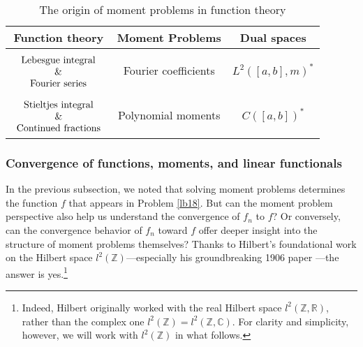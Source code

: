 \documentclass[12pt,b5paper,notitlepage]{article}
\theoremstyle{definition}
\theoremstyle{plain}
\newcommand{\Cbb}{\mathbb C}
\newcommand{\Zbb}{\mathbb Z}
\newcommand{\Rbb}{\mathbb R}
\numberwithin{equation}{section}
\begin{document}
\begin{table}[h]
\centering
 \begin{tabular}{|c|c|c|}
    \hline 
Function theory& \rule{0pt}{0.45cm} Moment Problems & Dual spaces\\
\hline
$\begin{array}{c}
\rule{0pt}{0.45cm}\text{Lebesgue integral} \\
\&\\
\text{Fourier series}
\end{array}$& Fourier coefficients&$L^2([a,b],m)^*$\\
\hline 
$\begin{array}{c}
\rule{0pt}{0.45cm}\text{Stieltjes integral} \\
\&\\
\text{Continued fractions}
\end{array}$
&Polynomial moments&$C([a,b])^*$\\
\hline
  \end{tabular}
\caption{The origin of moment problems in function theory}\label{tb2}
\end{table}



\subsubsection{Convergence of functions, moments, and linear functionals}





In the previous subsection, we noted that solving moment problems determines the function $f$ that appears in Problem \ref{lb18}. But can the moment problem perspective also help us understand the convergence of $f_n$ to $f$? Or conversely, can the convergence behavior of $f_n$ toward $f$ offer deeper insight into the structure of moment problems themselves? Thanks to Hilbert's foundational work on the Hilbert space $l^2(\Zbb)$---especially his groundbreaking 1906 paper \cite{Hil06}---the answer is yes.\footnote{Indeed, Hilbert originally worked with the real Hilbert space $l^2(\Zbb,\Rbb)$, rather than the complex one $l^2(\Zbb)=l^2(\Zbb,\Cbb)$. For clarity and simplicity, however, we will work with $l^2(\Zbb)$ in what follows.} 
\end{document}
